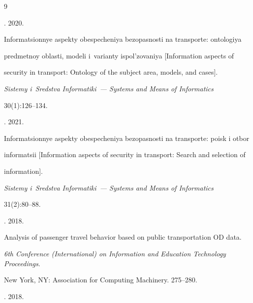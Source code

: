 




{\small\frenchspacing


{%




\begin{thebibliography}{9}







. 2020.


Informatsionnye aspekty obespecheniya bezopasnosti na transporte: ontologiya 


predmetnoy oblasti, modeli i~varianty ispol'zovaniya [Information aspects of 


security in transport: Ontology of the subject area, models, and cases].


\textit{Sistemy i~Sredstva Informatiki~--- Systems and Means of Informatics} 


30(1):126--134.




. 2021.


Informatsionnye aspekty obespecheniya bezopasnosti na transporte: poisk i otbor 


informatsii [Information aspects of security in transport: Search and selection of 


information].


\textit{Sistemy i~Sredstva Informatiki~--- Systems and Means of Informatics} 


31(2):80--88.




. 2018.  


Analysis of passenger travel behavior based on public transportation OD data.  


\textit{6th  Conference (International) on Information and Education Technology Proceedings}. 


New York, NY: Association for Computing Machinery. 275--280.




. 2018.  



\end{thebibliography}}}
